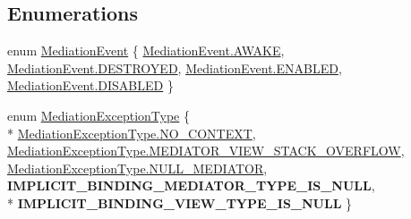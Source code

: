 \subsection*{Enumerations}
\begin{DoxyCompactItemize}
\item 
enum \hyperlink{namespacestrange_1_1extensions_1_1mediation_1_1api_ae5a81bb1edf9fca1d2aca9f4fada72a8}{Mediation\-Event} \{ \hyperlink{namespacestrange_1_1extensions_1_1mediation_1_1api_ae5a81bb1edf9fca1d2aca9f4fada72a8afca549f3541c801906abc34b45e8953e}{Mediation\-Event.\-A\-W\-A\-K\-E}, 
\hyperlink{namespacestrange_1_1extensions_1_1mediation_1_1api_ae5a81bb1edf9fca1d2aca9f4fada72a8a5d7e41d3ac0abca5974598807df874ea}{Mediation\-Event.\-D\-E\-S\-T\-R\-O\-Y\-E\-D}, 
\hyperlink{namespacestrange_1_1extensions_1_1mediation_1_1api_ae5a81bb1edf9fca1d2aca9f4fada72a8ac8cf6eea8f096ed51160b484d97c5bbd}{Mediation\-Event.\-E\-N\-A\-B\-L\-E\-D}, 
\hyperlink{namespacestrange_1_1extensions_1_1mediation_1_1api_ae5a81bb1edf9fca1d2aca9f4fada72a8a055c1a591abb0e8cd86dc969727bcc0b}{Mediation\-Event.\-D\-I\-S\-A\-B\-L\-E\-D}
 \}
\item 
enum \hyperlink{namespacestrange_1_1extensions_1_1mediation_1_1api_aef97993ec02a40c5f887dbfaf4f06e4a}{Mediation\-Exception\-Type} \{ \\*
\hyperlink{namespacestrange_1_1extensions_1_1mediation_1_1api_aef97993ec02a40c5f887dbfaf4f06e4aac89f949bb64ae5754bb687bf056de559}{Mediation\-Exception\-Type.\-N\-O\-\_\-\-C\-O\-N\-T\-E\-X\-T}, 
\hyperlink{namespacestrange_1_1extensions_1_1mediation_1_1api_aef97993ec02a40c5f887dbfaf4f06e4aa46ff5442e205aeec7c75b331260f5a49}{Mediation\-Exception\-Type.\-M\-E\-D\-I\-A\-T\-O\-R\-\_\-\-V\-I\-E\-W\-\_\-\-S\-T\-A\-C\-K\-\_\-\-O\-V\-E\-R\-F\-L\-O\-W}, 
\hyperlink{namespacestrange_1_1extensions_1_1mediation_1_1api_aef97993ec02a40c5f887dbfaf4f06e4aa51ed2efc0906076d4f2a50f028249d82}{Mediation\-Exception\-Type.\-N\-U\-L\-L\-\_\-\-M\-E\-D\-I\-A\-T\-O\-R}, 
{\bfseries I\-M\-P\-L\-I\-C\-I\-T\-\_\-\-B\-I\-N\-D\-I\-N\-G\-\_\-\-M\-E\-D\-I\-A\-T\-O\-R\-\_\-\-T\-Y\-P\-E\-\_\-\-I\-S\-\_\-\-N\-U\-L\-L}, 
\\*
{\bfseries I\-M\-P\-L\-I\-C\-I\-T\-\_\-\-B\-I\-N\-D\-I\-N\-G\-\_\-\-V\-I\-E\-W\-\_\-\-T\-Y\-P\-E\-\_\-\-I\-S\-\_\-\-N\-U\-L\-L}
 \}
\end{DoxyCompactItemize}


